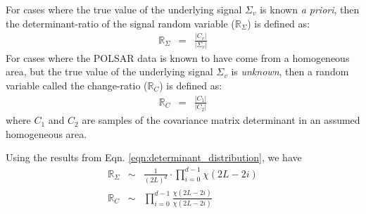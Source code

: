 \documentclass[journal]{IEEEtran}
\begin{document}
For cases where the true value of the underlying signal $\Sigma_v$ is known \textit{a priori},
then the determinant-ratio of the signal random variable ($\mathbb{R}_{\Sigma}$) %
  is defined as:
\begin{eqnarray}
  \mathbb{R}_{\Sigma} &=& \frac{|C_v|}{|\Sigma_v|} \label{eqn:determinant_ratio_observables}%
\end{eqnarray}
For cases where the POLSAR data is known to have come from a homogeneous area, but the true value of the underlying signal $\Sigma_v$ is \textit{unknown},
 then a random variable called the change-ratio ($\mathbb{R}_{C}$)  is defined as:
\begin{eqnarray}
  \mathbb{R}_{C} &=& \frac{|C_1|}{|C_2|} \label{eqn:determinant_ratio_samples_observables}%
\end{eqnarray}
where $C_1$ and $C_2$ are samples of the covariance matrix determinant in an assumed homogeneous area. 


Using the results from Eqn. \ref{eqn:determinant_distribution}, %
  we have
\begin{eqnarray}
\mathbb{R}_{\Sigma} &\sim& \frac{1}{(2L)^d} \cdot \prod_{i=0}^{d-1} \chi (2L-2i) \label{eqn:determinant_ratio_distribution} \\
\mathbb{R}_{C} &\sim& \prod_{i=0}^{d-1} \frac{\chi(2L-2i)}{\chi(2L-2i)} \label{eqn:change_ratio_distribution}
\end{eqnarray}
\end{document}

